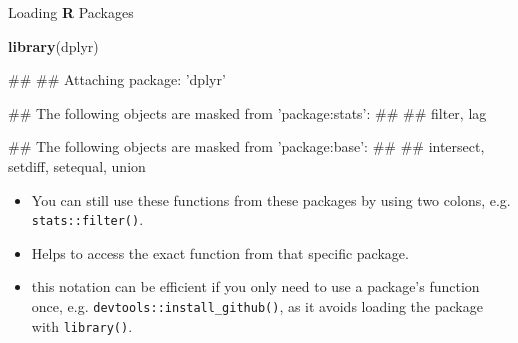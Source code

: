 \documentclass[ignorenonframetext,]{beamer}
\newenvironment{Shaded}{\begin{snugshade}}{\end{snugshade}}
\newcommand{\KeywordTok}[1]{\textcolor[rgb]{0.13,0.29,0.53}{\textbf{#1}}}
\newcommand{\NormalTok}[1]{#1}
\providecommand{\tightlist}{%
  \setlength{\itemsep}{0pt}\setlength{\parskip}{0pt}}
\let\oldShaded\Shaded
\let\endoldShaded\endShaded
\renewenvironment{Shaded}{\footnotesize\oldShaded}{\endoldShaded}
\let\oldverbatim\verbatim
\let\endoldverbatim\endverbatim
\renewenvironment{verbatim}{\footnotesize\oldverbatim}{\endoldverbatim}
\begin{document}
\begin{frame}[fragile]{Loading \textbf{R} Packages}

\begin{Shaded}
\begin{Highlighting}[]
\KeywordTok{library}\NormalTok{(dplyr)}
\end{Highlighting}
\end{Shaded}

\begin{verbatim}
## 
## Attaching package: 'dplyr'
\end{verbatim}

\begin{verbatim}
## The following objects are masked from 'package:stats':
## 
##     filter, lag
\end{verbatim}

\begin{verbatim}
## The following objects are masked from 'package:base':
## 
##     intersect, setdiff, setequal, union
\end{verbatim}

\vspace{-10pt}

\begin{itemize}
\tightlist
\item
  You can still use these functions from these packages by using two
  colons, e.g. \texttt{stats::filter()}.
\item
  Helps to access the exact function from that specific package.
\item
  this notation can be efficient if you only need to use a package's
  function once, e.g. \texttt{devtools::install\_github()}, as it avoids
  loading the package with \texttt{library()}.
\end{itemize}

\end{frame}
\end{document}
